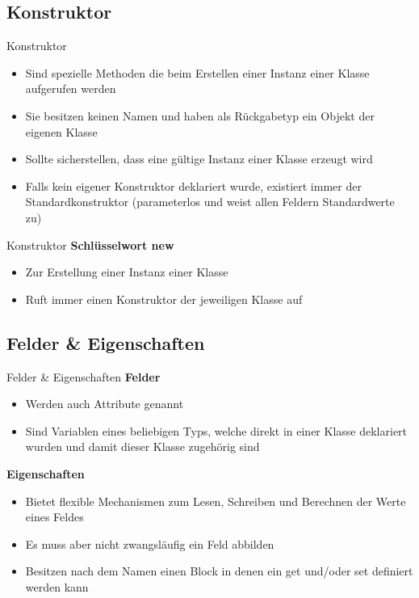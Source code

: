 \subsection{Konstruktor}
\begin{frame}{Konstruktor}
	\begin{itemize}
		\item Sind spezielle Methoden die beim Erstellen einer Instanz einer Klasse aufgerufen werden
		\item Sie besitzen keinen Namen und haben als Rückgabetyp ein Objekt der eigenen Klasse
		\item Sollte sicherstellen, dass eine gültige Instanz einer Klasse erzeugt wird
		\item Falls kein eigener Konstruktor deklariert wurde, existiert immer der Standardkonstruktor (parameterlos und weist allen Feldern Standardwerte zu)
	\end{itemize}
		
\end{frame}

\begin{frame}{Konstruktor}
	\textbf{Schlüsselwort new}\\
	\begin{itemize}
		\item Zur Erstellung einer Instanz einer Klasse
		\item Ruft immer einen Konstruktor der jeweiligen Klasse auf
	\end{itemize}
	
\end{frame}

\subsection{Felder \& Eigenschaften}
\begin{frame}{Felder \& Eigenschaften}
	\textbf{Felder}\\
	\begin{itemize}
		\item Werden auch Attribute genannt
		\item Sind Variablen eines beliebigen Typs, welche direkt in einer Klasse deklariert wurden und damit dieser Klasse zugehörig sind
	\end{itemize}
	\textbf{Eigenschaften}\\
	\begin{itemize}
		\item Bietet flexible Mechanismen zum Lesen, Schreiben und Berechnen der Werte eines Feldes
		\item Es muss aber nicht zwangsläufig ein Feld abbilden
		\item Besitzen nach dem Namen einen Block in denen ein \alert{get} und/oder \alert{set} definiert werden kann
	\end{itemize}
\end{frame}

